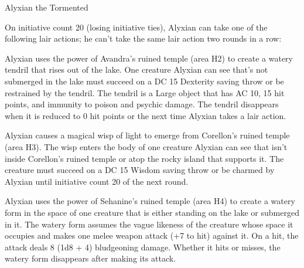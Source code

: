 \documentclass[10pt,a4paper,twoside,twocolumn,openany,nodeprecatedcode]{dndbook}
\begin{document}
\begin{DndMonster}[float=ht]{Alyxian the Tormented}
\begin{DndMonsterLegendaryActions}
\end{DndMonsterLegendaryActions}
\par {}
On initiative count 20 (losing initiative ties), Alyxian can take one of the following lair actions; he can't take the same lair action two rounds in a row:


\begin{description}[nolistsep]
\item[Avandra's Grasp]
Alyxian uses the power of Avandra's ruined temple (area H2) to create a watery tendril that rises out of the lake. One creature Alyxian can see that's not submerged in the lake must succeed on a DC 15 Dexterity saving throw or be restrained by the tendril. The tendril is a Large object that has AC 10, 15 hit points, and immunity to poison and psychic damage. The tendril disappears when it is reduced to 0 hit points or the next time Alyxian takes a lair action.

\item[Corellon's Charm]
Alyxian causes a magical wisp of light to emerge from Corellon's ruined temple (area H3). The wisp enters the body of one creature Alyxian can see that isn't inside Corellon's ruined temple or atop the rocky island that supports it. The creature must succeed on a DC 15 Wisdom saving throw or be charmed by Alyxian until initiative count 20 of the next round.

\item[Sehanine's Torment]
Alyxian uses the power of Sehanine's ruined temple (area H4) to create a watery form in the space of one creature that is either standing on the lake or submerged in it. The watery form assumes the vague likeness of the creature whose space it occupies and makes one melee weapon attack (+7 to hit) against it. On a hit, the attack deals 8 (1d8 + 4) bludgeoning damage. Whether it hits or misses, the watery form disappears after making its attack.


\end{description}
\end{DndMonster}
\end{document}

